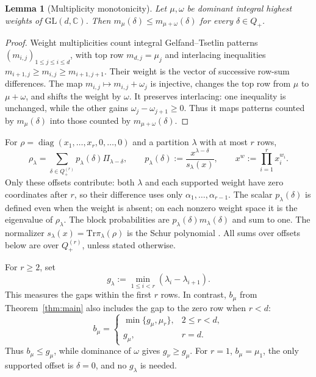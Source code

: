 \documentclass[a4paper,onecolumn,11pt]{quantumarticle}
\newtheorem{lem}{Lemma}
\newcommand*{\Tr}{\mathrm{Tr}}
\begin{document}
\begin{lem}[Multiplicity monotonicity]\label{lem:kostka}
Let $\mu,\omega$ be dominant integral highest weights of
$\mathrm{GL}(d,\mathbb C)$. Then
$m_\mu(\delta)\le m_{\mu+\omega}(\delta)$ for every $\delta\in Q_+$.
\end{lem}
\begin{proof}
Weight multiplicities count integral Gelfand--Tsetlin patterns
$(m_{i,j})_{1\le j\le i\le d}$, with top row $m_{d,j}=\mu_j$ and
interlacing inequalities
$m_{i+1,j}\ge m_{i,j}\ge m_{i+1,j+1}$.
Their weight is the vector of successive row-sum differences.
The map $m_{i,j}\mapsto m_{i,j}+\omega_j$ is injective, changes the
top row from $\mu$ to $\mu+\omega$, and shifts the weight by $\omega$.
It preserves interlacing: one inequality is unchanged, while the
other gains $\omega_j-\omega_{j+1}\ge0$. Thus it maps patterns counted
by $m_\mu(\delta)$ into those counted by $m_{\mu+\omega}(\delta)$.
\end{proof}

For $\rho=\operatorname{diag}(x_1,\ldots,x_r,0,\ldots,0)$ and a
partition $\lambda$ with at most $r$ rows,
\[
\rho_\lambda
=\sum_{\delta\in Q_+^{(r)}}
p_\lambda(\delta)\Pi_{\lambda-\delta},
\qquad
p_\lambda(\delta):=\frac{x^{\lambda-\delta}}{s_\lambda(x)},
\qquad x^w:=\prod_{i=1}^r x_i^{w_i}.
\]
Only these offsets contribute: both $\lambda$ and each supported weight
have zero coordinates after $r$, so their difference uses only
$\alpha_1,\ldots,\alpha_{r-1}$. The scalar $p_\lambda(\delta)$ is
defined even when the weight is absent; on each nonzero weight space
it is the eigenvalue of $\rho_\lambda$. The block probabilities are
$p_\lambda(\delta)m_\lambda(\delta)$ and sum to one. The normalizer
$s_\lambda(x)=\Tr\pi_\lambda(\rho)$ is the Schur polynomial
\cite{macdonald1995symmetric}. All sums over offsets below are over
$Q_+^{(r)}$, unless stated otherwise.

For $r\ge2$, set
\[
g_\lambda:=\min_{1\le i<r}(\lambda_i-\lambda_{i+1}).
\]
This measures the gaps within the first $r$ rows. In contrast,
$b_\mu$ from Theorem~\ref{thm:main} also includes the gap to the zero
row when $r<d$:
\[
b_\mu=\begin{cases}
\min\{g_\mu,\mu_r\},&2\le r<d,\\
g_\mu,&r=d.
\end{cases}
\]
Thus $b_\mu\le g_\mu$, while dominance of $\omega$ gives
$g_\nu\ge g_\mu$. For $r=1$, $b_\mu=\mu_1$, the only supported
offset is $\delta=0$, and no $g_\lambda$ is needed.
\end{document}

